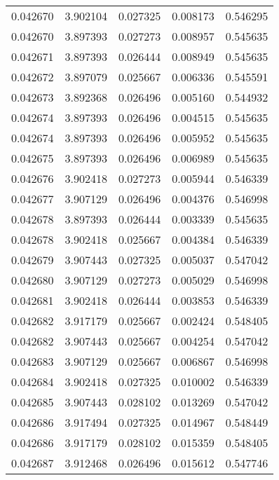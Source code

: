 \begin{tabular}{lrrrr}
0.042670    &  3.902104 &  0.027325 &  0.008173 &             0.546295 \\
0.042670    &  3.897393 &  0.027273 &  0.008957 &             0.545635 \\
0.042671    &  3.897393 &  0.026444 &  0.008949 &             0.545635 \\
0.042672    &  3.897079 &  0.025667 &  0.006336 &             0.545591 \\
0.042673    &  3.892368 &  0.026496 &  0.005160 &             0.544932 \\
0.042674    &  3.897393 &  0.026496 &  0.004515 &             0.545635 \\
0.042674    &  3.897393 &  0.026496 &  0.005952 &             0.545635 \\
0.042675    &  3.897393 &  0.026496 &  0.006989 &             0.545635 \\
0.042676    &  3.902418 &  0.027273 &  0.005944 &             0.546339 \\
0.042677    &  3.907129 &  0.026496 &  0.004376 &             0.546998 \\
0.042678    &  3.897393 &  0.026444 &  0.003339 &             0.545635 \\
0.042678    &  3.902418 &  0.025667 &  0.004384 &             0.546339 \\
0.042679    &  3.907443 &  0.027325 &  0.005037 &             0.547042 \\
0.042680    &  3.907129 &  0.027273 &  0.005029 &             0.546998 \\
0.042681    &  3.902418 &  0.026444 &  0.003853 &             0.546339 \\
0.042682    &  3.917179 &  0.025667 &  0.002424 &             0.548405 \\
0.042682    &  3.907443 &  0.025667 &  0.004254 &             0.547042 \\
0.042683    &  3.907129 &  0.025667 &  0.006867 &             0.546998 \\
0.042684    &  3.902418 &  0.027325 &  0.010002 &             0.546339 \\
0.042685    &  3.907443 &  0.028102 &  0.013269 &             0.547042 \\
0.042686    &  3.917494 &  0.027325 &  0.014967 &             0.548449 \\
0.042686    &  3.917179 &  0.028102 &  0.015359 &             0.548405 \\
0.042687    &  3.912468 &  0.026496 &  0.015612 &             0.547746 \\

\end{tabular}
